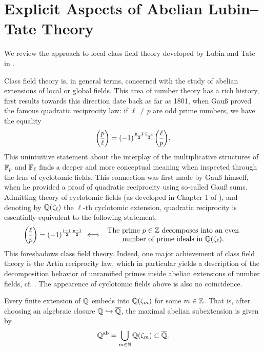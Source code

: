 \documentclass[../main.tex]{subfiles}
\begin{document}
\section{Explicit Aspects of Abelian Lubin--Tate Theory} %
\label{sec:Local Class Field Theory}
We review the approach to local class field theory developed by Lubin and Tate in
\cite{LubinTateFormalMult}. 

Class field theory is, in general terms, concerned with the study of 
abelian extensions of local or global fields. This area of number theory 
has a rich history, first results towards this direction date back as far as
1801, when Gauß proved the famous quadratic reciprocity law: if $\ell \neq p$
are odd prime numbers, we have the equality
\begin{equation*}
  \legendre p \ell = (-1)^{\frac{p-1}2 \frac{l-1}2} \legendre \ell p.
\end{equation*}
This unintuitive statement about the interplay of the multiplicative structures of
$\mathbb{F}_p$ and $\mathbb{F}_\ell$ finds a deeper and more conceptual meaning when inspected through
the lens of cyclotomic fields. This connection
was first made by Gauß himself, when he provided a proof of quadratic
reciprocity using so-called Gauß sums. Admitting theory of cyclotomic fields 
(as developed in Chapter 1 of \cite{neukirch2006algebraische}), and denoting by
$\mathbb{Q}(\zeta_\ell)$ the $\ell$-th cyclotomic extension,
quadratic reciprocity is essentially equivalent to the following statement.
\begin{equation*}
  \legendre \ell p = (-1)^{\frac{l-1}2 \frac{p-1}2} \iff \begin{array}c
    \text{The prime $p \in \Z$
    decomposes into an even} \\ \text{number of prime ideals in
  $\Q(\zeta_\ell)$.} \end{array}
\end{equation*}
This foreshadows class field theory. Indeed, one major achievement
of class field theory is the Artin reciprocity law, which in particular yields a 
description of the decomposition behavior of unramified primes inside abelian extensions
of number fields, cf. \cite[Theorem 7.3]{neukirch2006algebraische}. 
The appearence of cyclotomic fields above is also no coincidence.

\begin{thm} \label{thm:KroneckerWeber}
  Every finite extension of $\mathbb{Q}$ embeds into $\mathbb{Q}(\zeta_m)$ for some $m \in \mathbb{Z}$.
  That is, after choosing an algebraic closure $\mathbb{Q} \hookrightarrow \overline {\mathbb{Q}}$, the maximal abelian
  subextension is given by 
  \begin{equation*}
    \mathbb{Q}^{\mathrm{ab}} = \bigcup_{m \in \mathbb{N}} \mathbb{Q}(\zeta_m) \subset \overline {\mathbb{Q}}.
  \end{equation*}
\end{thm}
\end{document}
